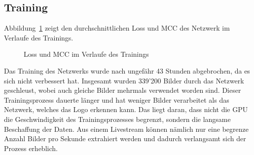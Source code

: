 \documentclass[12pt,a4paper]{report}
\begin{document}
\subsection{Training}
Abbildung~\ref{fig:loss2} zeigt den durchschnittlichen Loss und MCC des Netzwerk im Verlaufe des Trainings.
\begin{figure}[!h]%
    \centering
    \qquad
    \caption{Loss und MCC im Verlaufe des Trainings}%
    \label{fig:loss2}%
\end{figure}

Das Training des Netzwerks wurde nach ungefähr 43 Stunden abgebrochen, da es sich nicht verbessert hat.
Insgesamt wurden 339'200 Bilder durch das Netzwerk geschleust, wobei auch gleiche Bilder mehrmals verwendet worden sind.
Dieser Trainingsprozess dauerte länger und hat weniger Bilder verarbeitet als das Netzwerk, welches das Logo erkennen kann.
Das liegt daran, dass nicht die GPU die Geschwindigkeit des Trainingsprozesses begrenzt, sondern die langsame Beschaffung der Daten.
Aus einem Livestream können nämlich nur eine begrenze Anzahl Bilder pro Sekunde extrahiert werden und dadurch verlangsamt sich der Prozess erheblich.
\end{document}
